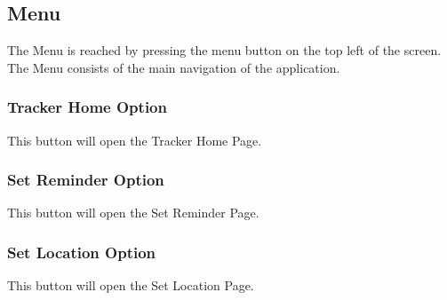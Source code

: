 \documentclass{article}
\begin{document}
\subsection{Menu}
The Menu is reached by pressing the menu button on the top left of the screen. The Menu consists of the main navigation of the application.
\subsubsection{Tracker Home Option}
This button will open the Tracker Home Page.
\subsubsection{Set Reminder Option}
This button will open the Set Reminder Page.
\subsubsection{Set Location Option}
This button will open the Set Location Page.
\end{document}
